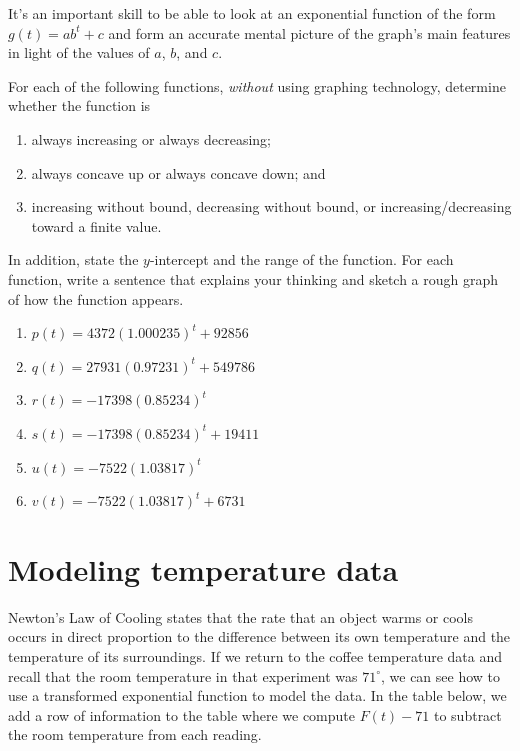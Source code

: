 \documentclass[nooutcomes]{ximera}
\begin{document}
It's an important skill to be able to look at an exponential function of the form $g(t) = ab^t + c$ and form an accurate mental picture of the graph's main features in light of the values of $a$, $b$, and $c$.

\begin{exploration}
For each of the following functions, \emph{without} using graphing technology, determine whether the function is
\begin{enumerate}[label=\roman*.]
\item always increasing or always decreasing;
\item always concave up or always concave down; and
\item increasing without bound, decreasing without bound, or increasing/decreasing toward a finite value.
\end{enumerate}
In addition, state the $y$-intercept and the range of the function.  For each function, write a sentence that explains your thinking and sketch a rough graph of how the function appears.
\begin{enumerate}[label=\alph*.]
\item $p(t) = 4372 (1.000235)^t + 92856$
\item $q(t) = 27931 (0.97231)^t + 549786$
\item $r(t) = -17398 (0.85234)^t$
\item $s(t) = -17398 (0.85234)^t + 19411$%
\item $u(t) = -7522 (1.03817)^t$%
\item $v(t) = -7522 (1.03817)^t + 6731$%
\end{enumerate}
\end{exploration}



\section{Modeling temperature data}
Newton's Law of Cooling  states that the rate that an object warms or cools occurs in direct proportion to the difference between its own temperature and the temperature of its surroundings.  If we return to the coffee temperature data  and recall that the room temperature in that experiment was $71^\circ$, we can see how to use a transformed exponential function to model the data.  In the table below, we add a row of information to the table where we compute $F(t)-71$ to subtract the room temperature from each reading.
\end{document}
